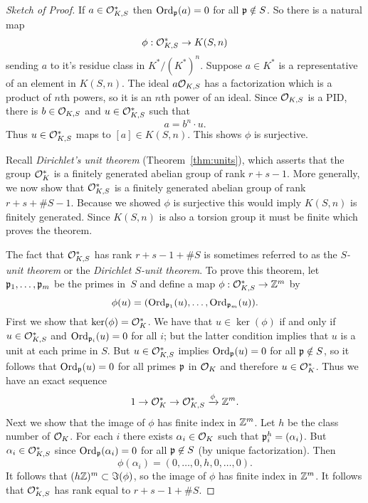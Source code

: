 \begin{proof}[Sketch of Proof]
  If $a \in \mathcal{O}_{K,S}^*$ then $\operatorname{Ord}_{\mathfrak{p}}(a)=0$ for all $\mathfrak{p} \notin S$.
  So there is a natural map
  \[
    \phi: \mathcal{O}_{K,S}^* \to K(S,n)
  \]
  sending $a$ to it's residue class in $K^*/(K^*)^n$.
  Suppose $a\in K^*$ is a representative of an element in $K(S,n)$.
  The ideal $a \mathcal{O}_{K,S}$ has a factorization which is a product of $n$th
  powers, so it is an $n$th power of an ideal. Since $\mathcal{O}_{K,S}$ is a PID,
  there is $b\in \mathcal{O}_{K,S}$ and $u\in \mathcal{O}_{K,S}^*$ such that
  \[
    a = b^n \cdot u.
  \]
  Thus $u\in \mathcal{O}_{K,S}^*$ maps to $[a] \in K(S,n)$. This shows $\phi$
  is surjective.
  
  Recall {\em Dirichlet's unit theorem} (Theorem~\ref{thm:units}),
  which asserts that the group $\mathcal{O}_K^*$ is a finitely generated
  abelian group of rank $r+s-1$.  More generally, we
  now show that $\mathcal{O}_{K,S}^*$ is a finitely generated abelian group of
  rank $r+s+\#S -1$.
  Because we showed $\phi$ is surjective this would imply $K(S,n)$ is finitely generated.
  Since $K(S,n)$ is also a torsion group it must be finite which proves the theorem.
  
  The fact that $\mathcal{O}_{K,S}^*$ has rank $r+s-1 + \#S$ is sometimes
  referred to as the \emph{$S$-unit theorem} or the
  \emph{Dirichlet $S$-unit theorem}. To prove this theorem,
  let $\mathfrak{p}_1,\ldots, \mathfrak{p}_m$ be the primes in~$S$
  and define a map $\phi: \mathcal{O}_{K,S}^* \to \mathbb{Z}^m$ by
  \[
    \phi(u) = (\operatorname{Ord}_{\mathfrak{p}_1}(u), \ldots, \operatorname{Ord}_{\mathfrak{p}_m}(u)).
  \]
  First we show that $\ker(\phi) = \mathcal{O}_K^*$.  We have that
  $u\in \ker(\phi)$ if and only if $u \in \mathcal{O}_{K,S}^*$
  and $\operatorname{Ord}_{\mathfrak{p}_i}(u) = 0$ for all $i$; but the latter condition
  implies that $u$ is a unit at each prime in $S$. But
  $u\in \mathcal{O}_{K,S}^*$ implies $\operatorname{Ord}_{\mathfrak{p}}(u) = 0$ for all $\mathfrak{p}\notin S$,
  so it follows that $\operatorname{Ord}_{\mathfrak{p}}(u)=0$ for all primes $\mathfrak{p}$ in $\mathcal{O}_K$
  and therefore $u\in \mathcal{O}_K^*$.
  Thus we have an exact sequence
  \[
    1 \to \mathcal{O}_K^* \to \mathcal{O}_{K,S}^* \xrightarrow{\phi} \mathbb{Z}^m.
  \]
  Next we show that the image of $\phi$ has finite index
  in $\mathbb{Z}^m$.  Let $h$ be the class number of $\mathcal{O}_K$.
  For each $i$ there exists $\alpha_i \in \mathcal{O}_K$
  such that $\mathfrak{p}_i^h = (\alpha_i)$.  But $\alpha_i \in \mathcal{O}_{K,S}^*$
  since $\operatorname{Ord}_{\mathfrak{p}}(\alpha_i) = 0$ for all $\mathfrak{p}\not\in S$ (by unique
  factorization). Then
  \[
    \phi(\alpha_i) = (0,\ldots,0,h,0,\ldots,0).
  \]
  It follows that $(h\mathbb{Z})^m \subset \Im(\phi)$, so
  the image of $\phi$ has finite index in $\mathbb{Z}^m$.  It follows
  that $\mathcal{O}_{K,S}^*$ has rank equal to $r+s-1+\#S$.
\end{proof}

